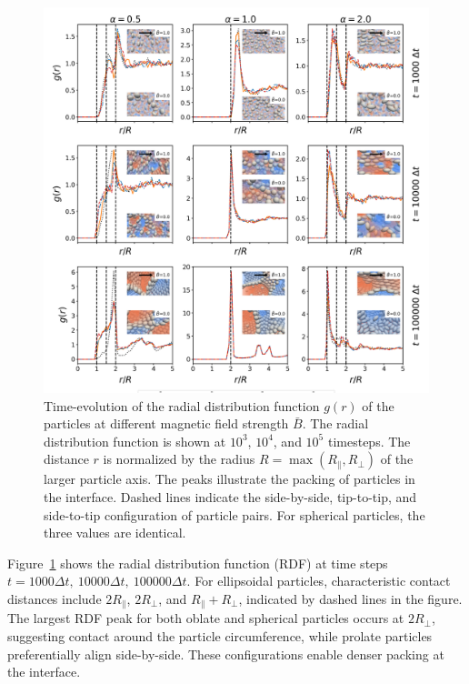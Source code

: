     \begin{figure}
    \centering
    \includegraphics[width=\textwidth]{../figures/results/paper1/rdf_compare_time.png}
    \caption{Time-evolution of the radial distribution function $g(r)$ of the particles at different magnetic field strength $\bar{B}$. The radial 
    distribution function is shown at $10^3$, $10^4$, and $10^5$ timesteps. The distance $r$ is normalized by the radius $R=\max(R_\parallel,R_\perp)$ 
    of the larger particle axis. The peaks illustrate the packing of particles in the interface. Dashed lines indicate the side-by-side, tip-to-tip, and 
    side-to-tip configuration of particle pairs. For spherical particles, the three values are identical.}
    \label{fig:rdf}
    \end{figure}

Figure~\ref{fig:rdf} shows the radial distribution function (RDF) at time steps \(t = 1000\Delta t,\ 10000\Delta t,\ 100000\Delta t\). 
For ellipsoidal particles, characteristic contact distances include \(2R_{\parallel}\), \(2R_{\perp}\), and \(R_{\parallel} + R_{\perp}\), 
indicated by dashed lines in the figure. The largest RDF peak for both oblate and spherical particles occurs at \(2R_\perp\), suggesting 
contact around the particle circumference, while prolate particles preferentially align side-by-side. These configurations enable denser 
packing at the interface.


